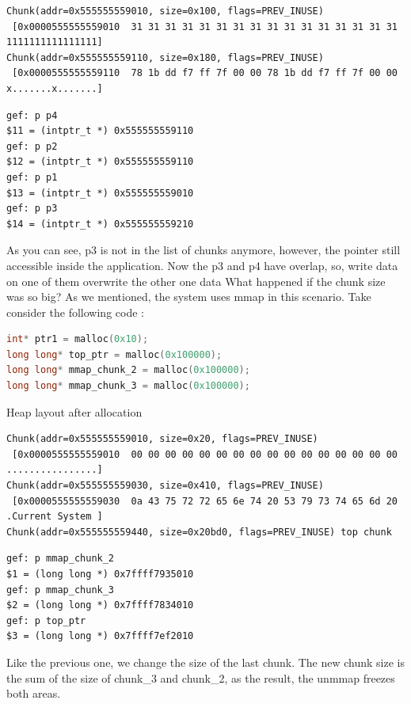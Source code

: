 \documentclass{masterthesis}
\begin{document}
\begin{lstlisting}[frame=tlrb]
Chunk(addr=0x555555559010, size=0x100, flags=PREV_INUSE)
 [0x0000555555559010  31 31 31 31 31 31 31 31 31 31 31 31 31 31 31 31 1111111111111111]
Chunk(addr=0x555555559110, size=0x180, flags=PREV_INUSE)
 [0x0000555555559110  78 1b dd f7 ff 7f 00 00 78 1b dd f7 ff 7f 00 00 x.......x.......]
 \end{lstlisting}

\begin{lstlisting}[frame=tlrb]
gef: p p4
$11 = (intptr_t *) 0x555555559110
gef: p p2
$12 = (intptr_t *) 0x555555559110
gef: p p1
$13 = (intptr_t *) 0x555555559010
gef: p p3
$14 = (intptr_t *) 0x555555559210
 \end{lstlisting}
 
As you can see, p3 is not in the list of chunks anymore, however, the pointer still accessible inside the application. Now the p3 and p4 have overlap, so, write data on one of them overwrite the other one data
What happened if the chunk size was so big? As we mentioned, the system uses mmap in this scenario. Take consider the following code : 

\begin{lstlisting}[language=c,frame=tlrb]
int* ptr1 = malloc(0x10);
long long* top_ptr = malloc(0x100000);
long long* mmap_chunk_2 = malloc(0x100000);
long long* mmap_chunk_3 = malloc(0x100000);
 \end{lstlisting}
 
Heap layout after allocation 

\begin{lstlisting}[frame=tlrb]
Chunk(addr=0x555555559010, size=0x20, flags=PREV_INUSE)
 [0x0000555555559010  00 00 00 00 00 00 00 00 00 00 00 00 00 00 00 00 ................]
Chunk(addr=0x555555559030, size=0x410, flags=PREV_INUSE)
 [0x0000555555559030  0a 43 75 72 72 65 6e 74 20 53 79 73 74 65 6d 20 .Current System ]
Chunk(addr=0x555555559440, size=0x20bd0, flags=PREV_INUSE) top chunk
 \end{lstlisting}

\begin{lstlisting}[frame=tlrb]
gef: p mmap_chunk_2
$1 = (long long *) 0x7ffff7935010
gef: p mmap_chunk_3
$2 = (long long *) 0x7ffff7834010
gef: p top_ptr
$3 = (long long *) 0x7ffff7ef2010
 \end{lstlisting}

Like the previous one, we change the size of the last chunk. The new chunk size is the sum of the size of chunk\_3 and chunk\_2, as the result, the unmmap freezes both areas.
\end{document}
